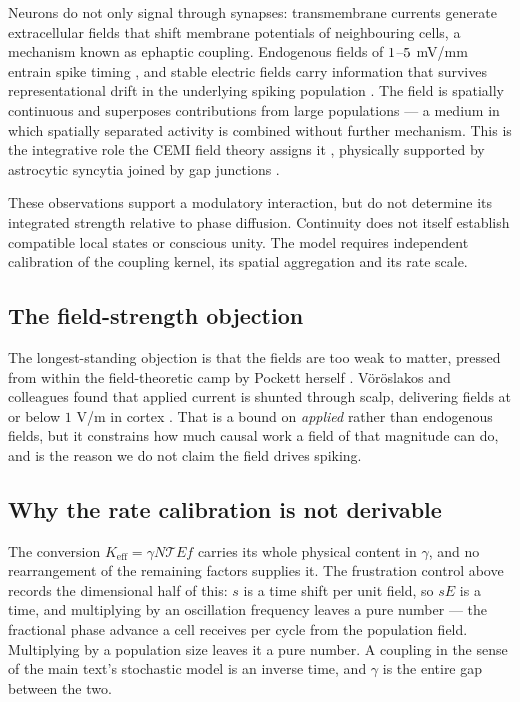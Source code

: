 \documentclass{article}
\renewcommand{\cite}[1]{\citep{#1}}
\begin{document}
Neurons do not only signal through synapses: transmembrane currents generate extracellular fields that shift membrane potentials of neighbouring cells, a mechanism known as ephaptic coupling. Endogenous fields of $1$--$5$ mV/mm entrain spike timing \cite{frohlich2010, anastassiou2015}, and stable electric fields carry information that survives representational drift in the underlying spiking population \cite{pinotsis2022, pinotsis2023ephaptic, pinotsis2023cytoelectric}. The field is spatially continuous and superposes contributions from large populations --- a medium in which spatially separated activity is combined without further mechanism. This is the integrative role the CEMI field theory assigns it \cite{mcfadden2002, mcfadden2020, pockett2012}, physically supported by astrocytic syncytia joined by gap junctions \cite{verkhratsky2018}.

These observations support a modulatory interaction, but do not determine its integrated strength relative to phase diffusion. Continuity does not itself establish compatible local states or conscious unity. The model requires independent calibration of the coupling kernel, its spatial aggregation and its rate scale.

\subsection{The field-strength objection}

The longest-standing objection is that the fields are too weak to matter, pressed from within the field-theoretic camp by Pockett herself \cite{pockett2012, pockett2002}. V\"or\"oslakos and colleagues found that applied current is shunted through scalp, delivering fields at or below $1$ V/m in cortex \cite{voroslakos2018}. That is a bound on \emph{applied} rather than endogenous fields, but it constrains how much causal work a field of that magnitude can do, and is the reason we do not claim the field drives spiking.

\subsection{Why the rate calibration is not derivable}
\label{sec:gamma-identifiability}

The conversion $K_{\mathrm{eff}}=\gamma N \mathcal{T} E f$ carries its whole physical content in $\gamma$, and no rearrangement of the remaining factors supplies it. The frustration control above records the dimensional half of this: $s$ is a time shift per unit field, so $sE$ is a time, and multiplying by an oscillation frequency leaves a pure number --- the fractional phase advance a cell receives per cycle from the population field. Multiplying by a population size leaves it a pure number. A coupling in the sense of the main text's stochastic model is an inverse time, and $\gamma$ is the entire gap between the two.
\end{document}
